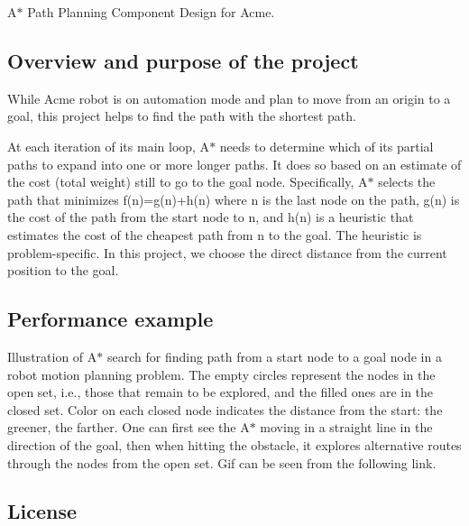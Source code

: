 A$\ast$ Path Planning Component Design for Acme.

\href{https://travis-ci.org/SonamYeshe/AStarPathPlanning}{\tt } \subsection*{\href{https://coveralls.io/github/SonamYeshe/AStarPathPlanning?branch=master}{\tt } }

\subsection*{Overview and purpose of the project}

While Acme robot is on automation mode and plan to move from an origin to a goal, this project helps to find the path with the shortest path.

At each iteration of its main loop, A$\ast$ needs to determine which of its partial paths to expand into one or more longer paths. It does so based on an estimate of the cost (total weight) still to go to the goal node. Specifically, A$\ast$ selects the path that minimizes f(n)=g(n)+h(n) where n is the last node on the path, g(n) is the cost of the path from the start node to n, and h(n) is a heuristic that estimates the cost of the cheapest path from n to the goal. The heuristic is problem-\/specific. In this project, we choose the direct distance from the current position to the goal.

\subsection*{Performance example}

Illustration of A$\ast$ search for finding path from a start node to a goal node in a robot motion planning problem. The empty circles represent the nodes in the open set, i.\+e., those that remain to be explored, and the filled ones are in the closed set. Color on each closed node indicates the distance from the start\+: the greener, the farther. One can first see the A$\ast$ moving in a straight line in the direction of the goal, then when hitting the obstacle, it explores alternative routes through the nodes from the open set. Gif can be seen from the following link. 

 

\subsection*{License}

